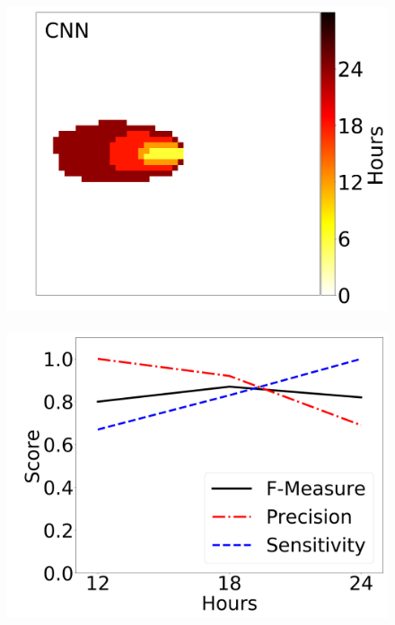 \documentclass[smallcondensed]{svjour3}     %
\begin{document}
\begin{figure}[htbp]
	\includegraphics[height=0.16\textheight]{timeAnalysis_network1.png}
	~
	\includegraphics[height=0.16\textheight]{timeAnalysis_fmeasure1.png}
	\\

\end{figure}
\end{document}
